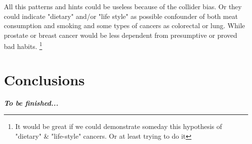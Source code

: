 \documentclass{article}
\begin{document}
All this patterns and hints could be useless because of the collider bias. Or they could indicate "dietary" and/or "life style" as possible confounder of both meat consumption and smoking and some types of cancers as colorectal or lung. While prostate or breast cancer would be less dependent from presumptive or proved bad habits. \footnote{It would be great if we could demonstrate someday this hypothesis of "dietary" \& "life-style" cancers. Or at least trying to do it}


\section{Conclusions}

\textbf{\textit{To be finished...}}



\end{document}

